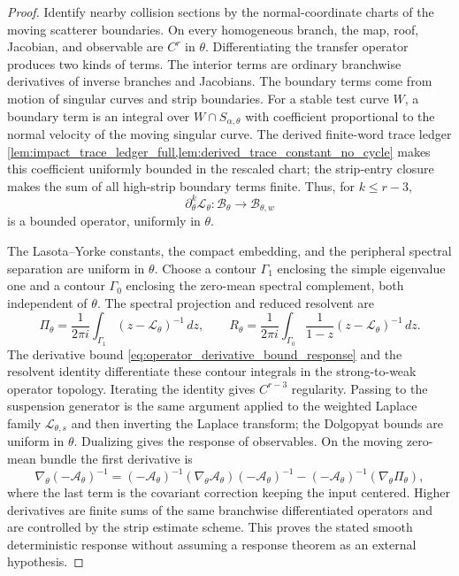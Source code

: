 \documentclass[12pt, letterpaper]{amsart}
\newcommand{\Acal}{\mathcal{A}}
\newcommand{\Bcal}{\mathcal{B}}
\theoremstyle{plain}
\theoremstyle{definition}
\theoremstyle{remark}
\begin{document}
\begin{proof}
Identify nearby collision sections by the normal-coordinate charts of the
moving scatterer boundaries.  On every homogeneous branch, the map, roof,
Jacobian, and observable are $C^{r}$ in $\theta$.  Differentiating the transfer
operator produces two kinds of terms.  The interior terms are ordinary
branchwise derivatives of inverse branches and Jacobians.  The boundary terms
come from motion of singular curves and strip boundaries.  For a stable test
curve $W$, a boundary term is an integral over $W\cap S_{\alpha,\theta}$ with
coefficient proportional to the normal velocity of the moving singular curve.
The derived finite-word trace ledger \cref{lem:impact_trace_ledger_full,lem:derived_trace_constant_no_cycle} makes this
coefficient uniformly bounded in the rescaled chart; the strip-entry closure
makes the sum of all high-strip boundary terms finite.  Thus, for
$k\le r-3$,
\begin{equation}
\label{eq:operator_derivative_bound_response}
    \partial_\theta^k\mathscr{L}_\theta:
    \Bcal_\theta\longrightarrow \Bcal_{\theta,w}
\end{equation}
is a bounded operator, uniformly in $\theta$.

The Lasota--Yorke constants, the compact embedding, and the peripheral spectral
separation are uniform in $\theta$.  Choose a contour $\Gamma_1$ enclosing the
simple eigenvalue one and a contour $\Gamma_0$ enclosing the zero-mean spectral
complement, both independent of $\theta$.  The spectral projection and reduced
resolvent are
\begin{equation}
    \Pi_\theta=\frac1{2\pi i}\int_{\Gamma_1}(z-\mathscr{L}_\theta)^{-1}\,dz,
    \qquad
    R_\theta=\frac1{2\pi i}\int_{\Gamma_0}\frac1{1-z}(z-\mathscr{L}_\theta)^{-1}\,dz .
\end{equation}
The derivative bound \eqref{eq:operator_derivative_bound_response} and the
resolvent identity differentiate these contour integrals in the strong-to-weak
operator topology.  Iterating the identity gives $C^{r-3}$ regularity.  Passing
to the suspension generator is the same argument applied to the weighted
Laplace family $\mathscr{L}_{\theta,s}$ and then inverting the Laplace transform;
the Dolgopyat bounds are uniform in $\theta$.  Dualizing gives the response of
observables.  On the moving zero-mean bundle the first derivative is
\begin{equation}
    \nabla_\theta(-\Acal_\theta)^{-1}
    =(-\Acal_\theta)^{-1}(\nabla_\theta\Acal_\theta)(-\Acal_\theta)^{-1}
      -(-\Acal_\theta)^{-1}(\nabla_\theta\Pi_\theta),
\end{equation}
where the last term is the covariant correction keeping the input centered.
Higher derivatives are finite sums of the same branchwise differentiated
operators and are controlled by the strip estimate scheme.  This proves the stated
smooth deterministic response without assuming a response theorem as an external hypothesis.
\end{proof}
\end{document}
